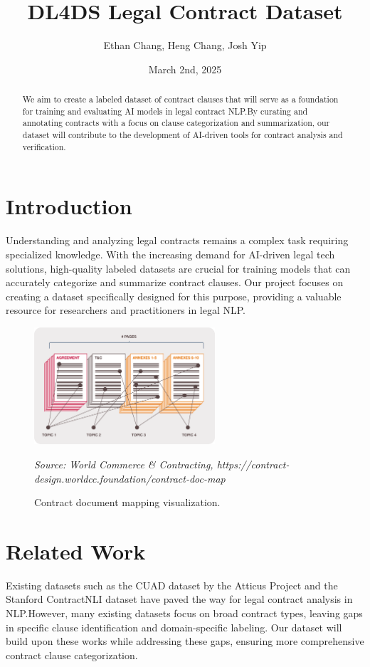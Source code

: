 \documentclass[11pt, oneside]{article}   	%
\title{DL4DS Legal Contract Dataset}
\author{Ethan Chang, Heng Chang, Josh Yip}
\date{March 2nd, 2025}		%
\begin{document}
\maketitle
\begin{abstract}
We aim to create a labeled dataset of contract clauses that will serve as a foundation for 
training and evaluating AI models in legal contract NLP.\@ By curating and annotating contracts with a focus on clause categorization and summarization, our dataset will contribute to the development of AI-driven tools for contract analysis and verification.
\end{abstract}



\section*{Introduction}
Understanding and analyzing legal contracts remains a complex task requiring specialized knowledge. With the increasing demand for AI-driven legal tech solutions, high-quality labeled datasets are crucial for training models that can accurately categorize and summarize contract clauses. Our project focuses on creating a dataset specifically designed for this purpose, providing a valuable resource for researchers and practitioners in legal NLP.\@

\begin{figure}[h]
    \centering
    \includegraphics[width=0.6\textwidth]{image.png}
    \caption{Contract document mapping visualization.}
    \textit{{Source}: World Commerce \& Contracting, https://contract-design.worldcc.foundation/contract-doc-map}
    \label{fig:contract-doc-map}
\end{figure}



\section*{Related Work}
Existing datasets such as the CUAD dataset by the Atticus Project and the Stanford ContractNLI dataset have paved the way for legal contract analysis in NLP.\@ However, many existing datasets focus on broad contract types, leaving gaps in specific clause identification and domain-specific labeling. Our dataset will build upon these works while addressing these gaps, ensuring more comprehensive contract clause categorization.
\end{document}
